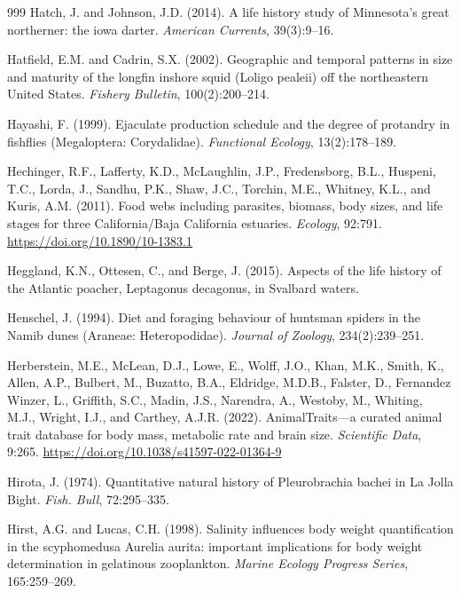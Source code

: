 \begin{thebibliography}{999}
Hatch, J. and Johnson, J.D. (2014). A life history study of Minnesota's great northerner: the iowa darter. \textit{American Currents}, 39(3):9--16.

Hatfield, E.M. and Cadrin, S.X. (2002). Geographic and temporal patterns in size and maturity of the longfin inshore squid (Loligo pealeii) off the northeastern United States. \textit{Fishery Bulletin}, 100(2):200--214.

Hayashi, F. (1999). Ejaculate production schedule and the degree of protandry in fishflies (Megaloptera: Corydalidae). \textit{Functional Ecology}, 13(2):178--189.

Hechinger, R.F., Lafferty, K.D., McLaughlin, J.P., Fredensborg, B.L., Huspeni, T.C., Lorda, J., Sandhu, P.K., Shaw, J.C., Torchin, M.E., Whitney, K.L., and Kuris, A.M. (2011). Food webs including parasites, biomass, body sizes, and life stages for three {C}alifornia/{B}aja {C}alifornia estuaries. \textit{Ecology}, 92:791. \url{https://doi.org/10.1890/10-1383.1}

Heggland, K.N., Ottesen, C., and Berge, J. (2015). Aspects of the life history of the Atlantic poacher, Leptagonus decagonus, in Svalbard waters.

Henschel, J. (1994). Diet and foraging behaviour of huntsman spiders in the Namib dunes (Araneae: Heteropodidae). \textit{Journal of Zoology}, 234(2):239--251.

Herberstein, M.E., McLean, D.J., Lowe, E., Wolff, J.O., Khan, M.K., Smith, K., Allen, A.P., Bulbert, M., Buzatto, B.A., Eldridge, M.D.B., Falster, D., Fernandez Winzer, L., Griffith, S.C., Madin, J.S., Narendra, A., Westoby, M., Whiting, M.J., Wright, I.J., and Carthey, A.J.R. (2022). {AnimalTraits}---a curated animal trait database for body mass, metabolic rate and brain size. \textit{Scientific Data}, 9:265. \url{https://doi.org/10.1038/s41597-022-01364-9}

Hirota, J. (1974). Quantitative natural history of Pleurobrachia bachei in La Jolla Bight. \textit{Fish. Bull}, 72:295--335.

Hirst, A.G. and Lucas, C.H. (1998). Salinity influences body weight quantification in the scyphomedusa Aurelia aurita: important implications for body weight determination in gelatinous zooplankton. \textit{Marine Ecology Progress Series}, 165:259--269.


\end{thebibliography}
